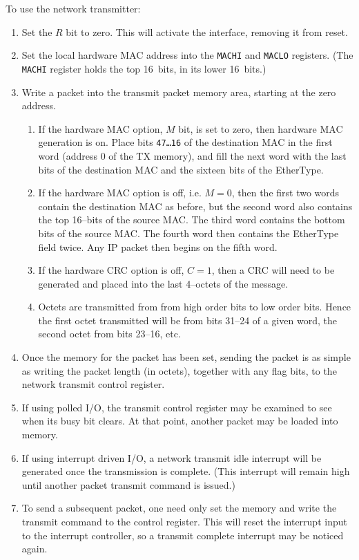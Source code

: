 \documentclass{gqtekspec}
\begin{document}
To use the network transmitter:
\begin{enumerate}
\item Set the $R$ bit to zero.  This will activate the interface, 
	removing it from reset.
\item Set the local hardware MAC address into the {\tt MACHI}
	and {\tt MACLO} registers.  (The {\tt MACHI} register holds the top
	16~bits, in its lower 16~bits.)
\item Write a packet into the transmit packet memory area, starting at the
	zero address. 
	\begin{enumerate}
	\item If the hardware MAC option, $M$ bit, is set to zero, then
		hardware MAC generation is on.  Place bits {\tt 47\ldots 16}
		of the destination MAC in the first word (address 0 of the
		TX memory), and fill the next word with the last bits of the
		destination MAC and the sixteen bits of the EtherType.
	\item If the hardware MAC option is off, i.e. $M=0$, then the
		first two words contain the destination MAC as before,
		but the second word also contains the top 16--bits of the
		source MAC.  The third word contains the bottom bits of the
		source MAC.  The fourth word then contains the EtherType
		field twice.  Any IP packet then begins on the fifth word.
	\item If the hardware CRC option is off, $C=1$, then a CRC will need
		to be generated and placed into the last 4--octets of the
		message.
	\item Octets are transmitted from from high order bits to low order 
		bits.  Hence the first octet transmitted will be from
		bits 31--24 of a given word, the second octet from bits
		23--16, etc.
	\end{enumerate}
\item Once the memory for the packet has been set, sending the packet
	is as simple as writing the packet length (in octets), together with
	any flag bits, to the network transmit control register.
\item If using polled I/O, the transmit control register may be examined to
	see when its busy bit clears.  At that point, another packet may be
	loaded into memory.
\item If using interrupt driven I/O, a network transmit idle interrupt will be
	generated once the transmission is complete.  (This interrupt will
	remain high until another packet transmit command is issued.)
\item To send a subsequent packet, one need only set the memory and write
	the transmit command to the control register.  This will reset the
	interrupt input to the interrupt controller, so a transmit complete
	interrupt may be noticed again.
\end{enumerate}
\end{document}
